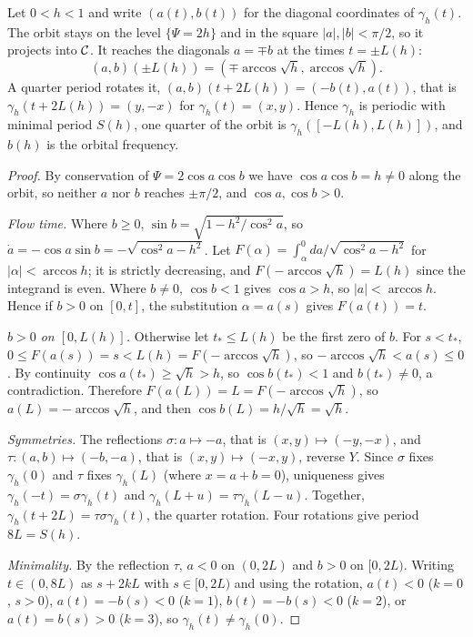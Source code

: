 \begin{lemma}
\label{lem:period-orbit}
\leanok
Let $0<h<1$ and write $(a(t),b(t))$ for the diagonal coordinates of $\gamma_h(t)$.
The orbit stays on the level $\{\Psi=2h\}$ and in the square $|a|,|b|<\pi/2$, so it
projects into $\mathcal{C}$. It reaches the diagonals $a=\mp b$ at the times
$t=\pm L(h)$:
\[
  (a,b)(\pm L(h))=(\mp\arccos\sqrt h,\arccos\sqrt h).
\]
A quarter period rotates it, $(a,b)(t+2L(h))=(-b(t),a(t))$, that is
$\gamma_h(t+2L(h))=(y,-x)$ for $\gamma_h(t)=(x,y)$. Hence $\gamma_h$ is periodic with
minimal period $S(h)$, one quarter of the orbit is $\gamma_h([-L(h),L(h)])$, and $b(h)$
is the orbital frequency.
\end{lemma}

\begin{proof}
\leanok
By conservation of $\Psi=2\cos a\cos b$ we have $\cos a\cos b=h\ne0$ along the orbit,
so neither $a$ nor $b$ reaches $\pm\pi/2$, and $\cos a,\cos b>0$.

\emph{Flow time.} Where $b\ge0$, $\sin b=\sqrt{1-h^2/\cos^2a}$, so
$\dot a=-\cos a\sin b=-\sqrt{\cos^2a-h^2}$. Let
$F(\alpha)=\int_\alpha^0da/\sqrt{\cos^2a-h^2}$ for $|\alpha|<\arccos h$; it is strictly
decreasing, and $F(-\arccos\sqrt h)=L(h)$ since the integrand is even. Where
$b\ne0$, $\cos b<1$ gives $\cos a>h$, so $|a|<\arccos h$. Hence if $b>0$ on $[0,t]$,
the substitution $\alpha=a(s)$ gives $F(a(t))=t$.

\emph{$b>0$ on $[0,L(h)]$.} Otherwise let $t_*\le L(h)$ be the first zero of $b$.
For $s<t_*$, $0\le F(a(s))=s<L(h)=F(-\arccos\sqrt h)$, so
$-\arccos\sqrt h<a(s)\le0$. By continuity $\cos a(t_*)\ge\sqrt h>h$, so
$\cos b(t_*)<1$ and $b(t_*)\ne0$, a contradiction. Therefore $F(a(L))=L=F(-\arccos\sqrt h)$,
so $a(L)=-\arccos\sqrt h$, and then $\cos b(L)=h/\sqrt h=\sqrt h$.

\emph{Symmetries.} The reflections $\sigma\colon a\mapsto-a$, that is
$(x,y)\mapsto(-y,-x)$, and $\tau\colon(a,b)\mapsto(-b,-a)$, that is
$(x,y)\mapsto(-x,y)$, reverse $Y$. Since $\sigma$ fixes $\gamma_h(0)$ and $\tau$
fixes $\gamma_h(L)$ (where $x=a+b=0$), uniqueness gives $\gamma_h(-t)=\sigma\gamma_h(t)$
and $\gamma_h(L+u)=\tau\gamma_h(L-u)$. Together,
$\gamma_h(t+2L)=\tau\sigma\gamma_h(t)$, the quarter rotation. Four rotations give
period $8L=S(h)$.

\emph{Minimality.} By the reflection $\tau$, $a<0$ on $(0,2L)$ and $b>0$ on
$[0,2L)$. Writing $t\in(0,8L)$ as $s+2kL$ with $s\in[0,2L)$ and using the rotation,
$a(t)<0$ ($k=0$, $s>0$), $a(t)=-b(s)<0$ ($k=1$), $b(t)=-b(s)<0$ ($k=2$), or
$a(t)=b(s)>0$ ($k=3$), so $\gamma_h(t)\ne\gamma_h(0)$.
\end{proof}


